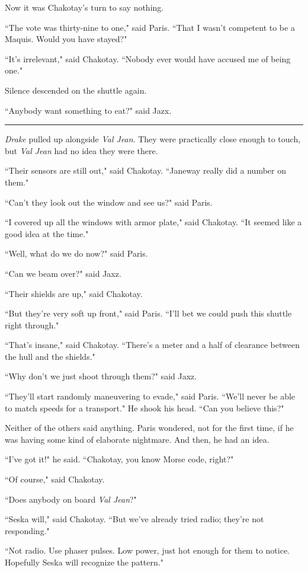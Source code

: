 \documentclass[twoside,letterpaper,12pt]{memoir}
\begin{document}
Now it was Chakotay's turn to say nothing.

``The vote was thirty-nine to one," said Paris. ``That I wasn't competent to be a Maquis. Would you have stayed?"

``It's irrelevant," said Chakotay. ``Nobody ever would have accused me of being one."

Silence descended on the shuttle again.

``Anybody want something to eat?" said Jazx.

\fancybreak{\rule{3cm}{0.4 pt}}
\textit{Drake} pulled up alongside \textit{Val Jean}. They were practically close enough to touch, but \textit{Val Jean} had no idea they were there.

``Their sensors are still out," said Chakotay. ``Janeway really did a number on them."

``Can't they look out the window and see us?" said Paris.

``I covered up all the windows with armor plate," said Chakotay. ``It seemed like a good idea at the time."

``Well, what do we do now?" said Paris.

``Can we beam over?" said Jaxz.

``Their shields are up," said Chakotay.

``But they're very soft up front," said Paris. ``I'll bet we could push this shuttle right through."

``That's insane," said Chakotay. ``There's a meter and a half of clearance between the hull and the shields."

``Why don't we just shoot through them?" said Jaxz.

``They'll start randomly maneuvering to evade," said Paris. ``We'll never be able to match speeds for a transport." He shook his head. ``Can you believe this?"

Neither of the others said anything. Paris wondered, not for the first time, if he was having some kind of elaborate nightmare. And then, he had an idea.

``I've got it!" he said. ``Chakotay, you know Morse code, right?"

``Of course," said Chakotay.

``Does anybody on board \textit{Val Jean}?"

``Seska will," said Chakotay. ``But we've already tried radio; they're not responding."

``Not radio. Use phaser pulses. Low power, just hot enough for them to notice. Hopefully Seska will recognize the pattern."
\end{document}
